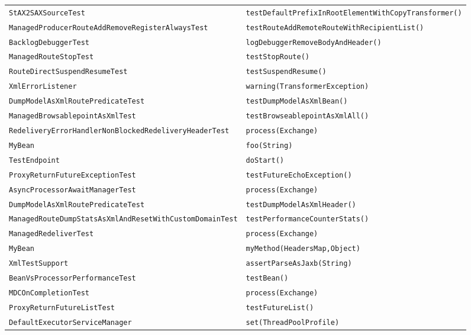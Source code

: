\begin{center}
\begin{longtable}{ll}
\lstinline/StAX2SAXSourceTest/&{\lstinline/testDefaultPrefixInRootElementWithCopyTransformer()/}\\
\lstinline/ManagedProducerRouteAddRemoveRegisterAlwaysTest/&{\lstinline/testRouteAddRemoteRouteWithRecipientList()/}\\
\lstinline/BacklogDebuggerTest/&{\lstinline/logDebuggerRemoveBodyAndHeader()/}\\
\lstinline/ManagedRouteStopTest/&{\lstinline/testStopRoute()/}\\
\lstinline/RouteDirectSuspendResumeTest/&{\lstinline/testSuspendResume()/}\\
\lstinline/XmlErrorListener/&{\lstinline/warning(TransformerException)/}\\
\lstinline/DumpModelAsXmlRoutePredicateTest/&{\lstinline/testDumpModelAsXmlBean()/}\\
\lstinline/ManagedBrowsablepointAsXmlTest/&{\lstinline/testBrowseablepointAsXmlAll()/}\\
\lstinline/RedeliveryErrorHandlerNonBlockedRedeliveryHeaderTest/&{\lstinline/process(Exchange)/}\\
\lstinline/MyBean/&{\lstinline/foo(String)/}\\
\lstinline/TestEndpoint/&{\lstinline/doStart()/}\\
\lstinline/ProxyReturnFutureExceptionTest/&{\lstinline/testFutureEchoException()/}\\
\lstinline/AsyncProcessorAwaitManagerTest/&{\lstinline/process(Exchange)/}\\
\lstinline/DumpModelAsXmlRoutePredicateTest/&{\lstinline/testDumpModelAsXmlHeader()/}\\
\lstinline/ManagedRouteDumpStatsAsXmlAndResetWithCustomDomainTest/&{\lstinline/testPerformanceCounterStats()/}\\
\lstinline/ManagedRedeliverTest/&{\lstinline/process(Exchange)/}\\
\lstinline/MyBean/&{\lstinline/myMethod(HeadersMap,Object)/}\\
\lstinline/XmlTestSupport/&{\lstinline/assertParseAsJaxb(String)/}\\
\lstinline/BeanVsProcessorPerformanceTest/&{\lstinline/testBean()/}\\
\lstinline/MDCOnCompletionTest/&{\lstinline/process(Exchange)/}\\
\lstinline/ProxyReturnFutureListTest/&{\lstinline/testFutureList()/}\\
\lstinline/DefaultExecutorServiceManager/&{\lstinline/set(ThreadPoolProfile)/}\\

\end{longtable}
\end{center}
